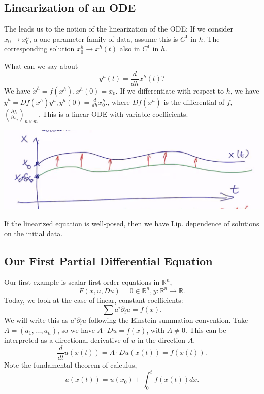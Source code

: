 \documentclass[11pt]{scrartcl}
\newcommand{\R}{\mathbb{R}}
\begin{document}
\subsection{Linearization of an ODE}
The leads us to the notion of the linearization of the ODE: If we consider $x_0 \rightarrow x_0^h$, a one parameter family of data, assume this is $C^1$ in $h$.  The corresponding solution $x_0^h \rightarrow x^h(t)$ also in $C^1$ in $h$.  

What can we say about $$y^h(t) = \frac{d}{dh}x^h(t)?$$  We have $\dot{x}^h = f(x^h), x^h(0) = x_0.$  If we differentiate with respect to $h$, we have $\dot{y}^h = Df(x^h)y^h, y^h(0) = \frac{d}{dh}x_0^h.$, 
where $Df(x^h)$ is the differential of $f$, $\left (\frac{\partial f_i}{\partial x_j}\right )_{n\times m}$.   This is a linear ODE with variable coefficients.
\begin{center}
\includegraphics[scale=0.5]{linear.png}
\end{center}
\begin{proposition} If the linearized equation is well-posed, then we have Lip. dependence of solutions on the initial data.
\end{proposition}
\subsection{Our First Partial Differential Equation}
Our first example is scalar first order equations in $\R^n$, $$F(x, u, Du) = 0 \in \R^n, y:\R^n \rightarrow \R.$$
Today, we look at the case of linear, constant coefficients:
$$\sum a^i \partial_i u = f(x).$$
We will write this as $a^i \partial_i u$ following the Einstein summation convention.
Take $A = (a_1, \dots, a_n)$, so we have $A \cdot Du = f(x)$, with $A \ne 0$.  This can be interpreted as a directional derivative of $u$ in the direction $A$.
$$\frac{d}{dt}u(x(t)) = A \cdot Du(x(t)) = f(x(t)).$$
Note the fundamental theorem of calculus,
$$u(x(t)) = u(x_0) +\int_0^t f(x(t))dx.$$
\end{document}
